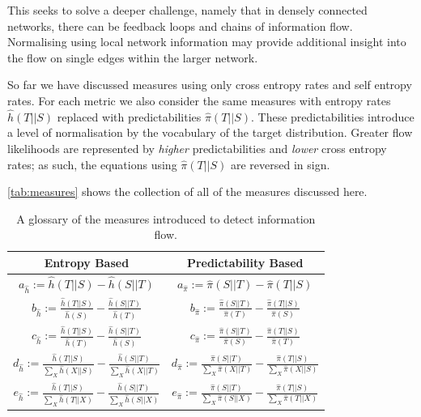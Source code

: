 This seeks to solve a deeper challenge, namely that in densely connected networks, there can be feedback loops and chains of information flow. Normalising using local network information may provide additional insight into the flow on single edges within the larger network.

So far we have discussed measures using only cross entropy rates and self entropy rates. For each metric we also consider the same measures with entropy rates $\hat{h}(T||S)$ replaced with predictabilities $\hat{\pi}(T||S)$. These predictabilities introduce a level of normalisation by the vocabulary of the target distribution. Greater flow likelihoods are represented by \emph{higher} predictabilities and \emph{lower} cross entropy rates; as such, the equations using $\hat{\pi}(T||S)$ are reversed in sign.

\autoref{tab:measures} shows the collection of all of the measures discussed here. 

\begin{table}[!htbp]
\centering
\begin{tabular}{cc}
 Entropy Based & Predictability Based  \\ 
\toprule
 $ \displaystyle a_{\hat{h}} := \hat{h}(T||S) - \hat{h}(S||T)$ & 
$ \displaystyle a_{\hat{\pi}} := \hat{\pi}(S||T) - \hat{\pi}(T||S)$ \\
\midrule
 $ \displaystyle b_{\hat{h}} := \frac{\hat{h}(T||S)}{\hat{h}(S)} - \frac{\hat{h}(S||T)}{\hat{h}(T)}$ & 
$ \displaystyle b_{\hat{\pi}} := \frac{\hat{\pi}(S||T)}{\hat{\pi}(T)} - \frac{\hat{\pi}(T||S)}{\hat{\pi}(S)}$ \\
 $ \displaystyle c_{\hat{h}} := \frac{\hat{h}(T||S)}{\hat{h}(T)} - \frac{\hat{h}(S||T)}{\hat{h}(S)}$ & 
$ \displaystyle c_{\hat{\pi}} := \frac{\hat{\pi}(S||T)}{\hat{\pi}(S)} - \frac{\hat{\pi}(T||S)}{\hat{\pi}(T)}$ \\
\midrule 
 $ \displaystyle d_{\hat{h}} := \frac{\hat{h}(T||S)}{\sum_X \hat{h}(X||S)} - \frac{\hat{h}(S||T)}{\sum_X \hat{h}(X||T)}$ &
$ \displaystyle d_{\hat{\pi}} := \frac{\hat{\pi}(S||T)}{\sum_X \hat{\pi}(X||T)} - \frac{\hat{\pi}(T||S)}{\sum_X \hat{\pi}(X||S)}$  \\
\addlinespace[0.5ex]
 $ \displaystyle e_{\hat{h}} := \frac{\hat{h}(T||S)}{\sum_X \hat{h}(T||X)} - \frac{\hat{h}(S||T)}{\sum_X \hat{h}(S||X)}$ & 
$ \displaystyle e_{\hat{\pi}} := \frac{\hat{\pi}(S||T)}{\sum_X \hat{\pi}(S||X)} - \frac{\hat{\pi}(T||S)}{\sum_X \hat{\pi}(T||X)}$ \\
\end{tabular}
\caption{A glossary of the measures introduced to detect information flow.}\label{tab:measures}
\end{table}


